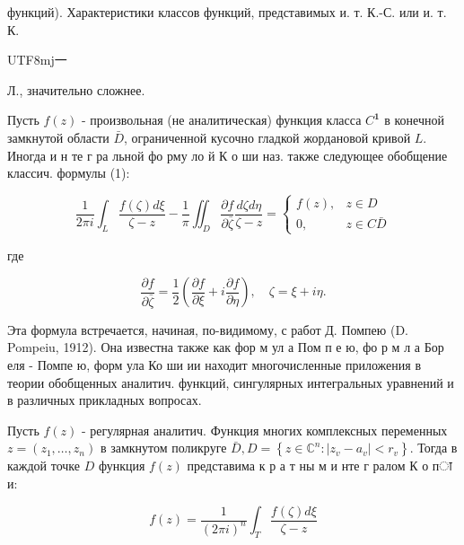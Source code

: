 \documentclass[10pt]{article}
\begin{document}
функций). Характеристики классов функций, представимых и. т. К.-С. или и. т. К.\begin{CJK}{UTF8}{mj}一\end{CJK}Л., значительно сложнее.



Пусть $f(z)$ - произвольная (не аналитическая) функция класса $C^{\mathbf{1}}$ в конечной замкнутой области $\bar{D}$, ограниченной кусочно гладкой жордановой кривой $L$. Иногда и н те г ра льной фо рму ло й К о ши наз. также следующее обобщение классич. формулы (1):



\[

\frac{1}{2 \pi i} \int_{L} \frac{f(\zeta) d \xi}{\zeta-z}-\frac{1}{\pi} \iint_{D} \frac{\partial f}{\partial \bar{\zeta}} \frac{d \zeta d \eta}{\zeta-z}= \begin{cases}f(z), & z \in D \\ 0, & z \in C \bar{D}\end{cases}

\]



где



\[

\frac{\partial f}{\partial \bar{\zeta}}=\frac{1}{2}\left(\frac{\partial f}{\partial \xi}+i \frac{\partial f}{\partial \eta}\right), \quad \zeta=\xi+i \eta .

\]



Эта формула встречается, начиная, по-видимому, с работ Д. Помпею (D. Pompeiu, 1912). Она известна также как фор м ул а Пом п е ю, фо р м л а Бор еля - Помпе ю, форм ула Ко ши ии находит многочисленные приложения в теории обобщенных аналитич. функций, сингулярных интегральных уравнений и в различных прикладных вопросах.



Пусть $f(z)$ - регулярная аналитич. Функция многих комплексных переменных $z=\left(z_{1}, \ldots, z_{n}\right)$ в замкнутом поликруге $\bar{D}, D=\left\{z \in \mathbb{C}^{n}:\left|z_{v}-a_{v}\right|<r_{v}\right\}$. Тогда в каждой точке $D$ функция $f(z)$ представима к р а т ны м и нте г ралом К о пा и:



\[

f(z)=\frac{1}{(2 \pi i)^{n}} \int_{T} \frac{f(\zeta) d \xi}{\zeta-z}

\]
\end{document}
